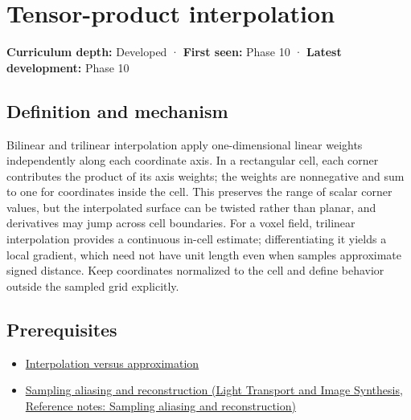 \hypertarget{appendix-0a09b6dfdc86}{}\label{referencestart:appendix-0a09b6dfdc86}
\section{Tensor-product interpolation}\label{appendix-0a09b6dfdc86-tensor-product-interpolation}

\hypertarget{appendix-0a09b6dfdc86-tensor-product-interpolation}{}

\textbf{Curriculum depth:} Developed · \textbf{First seen:} Phase 10 · \textbf{Latest development:} Phase 10

\begin{allmightroledefinition}

\subsection{Definition and mechanism}\label{appendix-0a09b6dfdc86-definition-and-mechanism}

\hypertarget{appendix-0a09b6dfdc86-definition-and-mechanism}{}

Bilinear and trilinear interpolation apply one-dimensional linear weights independently along each coordinate axis. In a rectangular cell, each corner contributes the product of its axis weights; the weights are nonnegative and sum to one for coordinates inside the cell. This preserves the range of scalar corner values, but the interpolated surface can be twisted rather than planar, and derivatives may jump across cell boundaries. For a voxel field, trilinear interpolation provides a continuous in-cell estimate; differentiating it yields a local gradient, which need not have unit length even when samples approximate signed distance. Keep coordinates normalized to the cell and define behavior outside the sampled grid explicitly.

\end{allmightroledefinition}

\subsection{Prerequisites}\label{appendix-0a09b6dfdc86-prerequisites}

\hypertarget{appendix-0a09b6dfdc86-prerequisites}{}

\begin{itemize}
\tightlist
\item
  \hyperref[appendix-0c2a5f69851e]{Interpolation versus approximation}
\item
  \href{../04-Light-Transport-and-Image-Synthesis/main.pdf\#nameddest=appendix-6a7869dd79a6}{Sampling aliasing and reconstruction (Light Transport and Image Synthesis, Reference notes: Sampling aliasing and reconstruction)}
\end{itemize}


